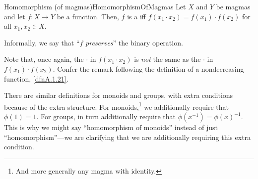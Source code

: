 \begin{dfn}{Homomorphism (of magmas)}{HomomorphismOfMagmas}
Let $X$ and $Y$ be magmas and let $f\colon X\rightarrow Y$ be a function.  Then, $f$ is a  iff $f(x_1\cdot x_2)=f(x_1)\cdot f(x_2)$ for all $x_1,x_2\in X$.
\begin{rmk}
Informally, we say that ``$f$ \emph{preserves}'' the binary operation.
\end{rmk}
\begin{rmk}
Note that, once again, the $\cdot$ in $f(x_1\cdot x_2)$ is \emph{not} the same as the $\cdot$ in $f(x_1)\cdot f(x_2)$.  Confer the remark following the definition of a nondecreasing function, \cref{dfnA.1.21}.
\end{rmk}
\begin{rmk}
There are similar definitions for monoids and groups, with extra conditions because of the extra structure.  For monoids,\footnote{And more generally any magma with identity.} we additionally require that $\phi (1)=1$.  For groups, in turn additionally require that $\phi (x^{-1})=\phi (x)^{-1}$.  This is why we might say ``homomorphism of monoids'' instead of just ``homomorphism''---we are clarifying that we are additionally requiring this extra condition.
\end{rmk}
\end{dfn}

